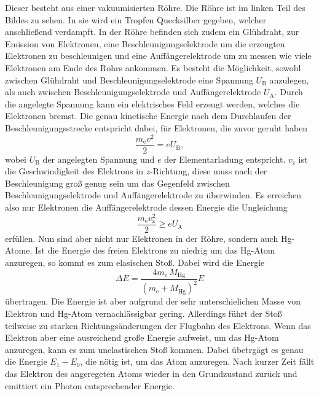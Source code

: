 Dieser besteht aus einer vakuumisierten Röhre.
Die Röhre ist im linken Teil des Bildes zu sehen.
In sie wird ein Tropfen Quecksilber gegeben, welcher anschließend verdampft.
In der Röhre befinden sich zudem ein Glühdraht, zur Emission von Elektronen, eine Beschleunigungselektrode um die erzeugten Elektronen zu beschleunigen und eine Auffängerelektrode um zu messen wie viele Elektronen am Ende des Rohrs ankommen.
Es besteht die Möglichkeit, sowohl zwischen Glühdraht und Beschleunigungselektrode eine Spannung $U_\text{B}$ anzulegen, als auch zwischen Beschleunigungselektrode und Auffängerelektrode $U_\text{A}$.
Durch die angelegte Spannung kann ein elektrisches Feld erzeugt werden, welches die Elektronen bremst.
Die genau kinetische Energie nach dem Durchlaufen der Beschleunigungsstrecke entspricht dabei, für Elektronen, die zuvor geruht haben
\begin{equation}
    \frac{m_\text{e} v^2}{2} = eU_\text{B},
    \label{eq:Energieelek}
\end{equation}
wobei $U_\text{B}$ der angelegten Spannung und $e$ der Elementarladung entspricht.
$v_\text{z}$ ist die Geschwindigkeit des Elektrons in $z$-Richtung, diese muss nach der Beschleunigung groß genug sein um das Gegenfeld zwischen Beschleunigungselektrode und Auffängerelektrode zu überwinden.
Es erreichen also nur Elektronen die Auffängerelektrode dessen Energie die Ungleichung
\begin{equation}
    \frac{m_\text{e} v_\text{z}^2}{2} \geq eU_\text{A}
    \label{2}
\end{equation}
erfüllen.
Nun sind aber nicht nur Elektronen in der Röhre, sondern auch Hg-Atome.
Ist die Energie des freien Elektrons zu niedrig um das Hg-Atom anzuregen, so kommt es zum elasischen Stoß.
Dabei wird die Energie 
\begin{equation}
    \Delta E = \frac{4m_\text{e}\, M_\text{Hg}}{\left (m_\text{e} + M_\text{Hg} \right )^2} E
    \label{3}
\end{equation}
übertragen.
Die Energie ist aber aufgrund der sehr unterschielichen Masse von Elektron und Hg-Atom vernachlässigbar gering.
Allerdings führt der Stoß teilweise zu starken Richtungsänderungen der Flugbahn des Elektrons.
Wenn das Elektron aber eine ausreichend große Energie aufweist, um das Hg-Atom anzuregen, kann es zum unelastischen Stoß kommen.
Dabei übetrgägt es genau die Energie $E_1 - E_0$, die nötig ist, um das Atom anzuregen.
Nach kurzer Zeit fällt das Elektron des angeregeten Atoms wieder in den Grundzustand zurück und emittiert ein Photon entsprechender Energie.
